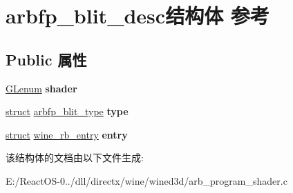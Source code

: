 \hypertarget{structarbfp__blit__desc}{}\section{arbfp\+\_\+blit\+\_\+desc结构体 参考}
\label{structarbfp__blit__desc}
\subsection*{Public 属性}
\begin{DoxyCompactItemize}
\item 
\mbox{\label{structarbfp__blit__desc_a9de76b97394e4d2f35df826ba0a3ab8d}} 
\hyperlink{interfacevoid}{G\+Lenum} {\bfseries shader}
\item 
\mbox{\label{structarbfp__blit__desc_ab0ec616446bedde325bb5960e55a4828}} 
\hyperlink{interfacestruct}{struct} \hyperlink{structarbfp__blit__type}{arbfp\+\_\+blit\+\_\+type} {\bfseries type}
\item 
\mbox{\label{structarbfp__blit__desc_a7163482ff4e672191db894607a1f3686}} 
\hyperlink{interfacestruct}{struct} \hyperlink{structwine__rb__entry}{wine\+\_\+rb\+\_\+entry} {\bfseries entry}
\end{DoxyCompactItemize}


该结构体的文档由以下文件生成\+:\begin{DoxyCompactItemize}
\item 
E\+:/\+React\+O\+S-\/0../dll/directx/wine/wined3d/arb\+\_\+program\+\_\+shader.\+c\end{DoxyCompactItemize}
